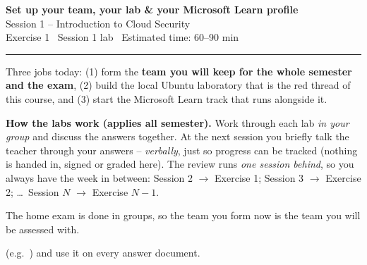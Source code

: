 \documentclass[11pt]{article}
\begin{document}
\begin{center}
  {\LARGE\bfseries Set up your team, your lab \& your Microsoft Learn profile}\\[3pt]
  {\large Session 1 -- Introduction to Cloud Security}\\[5pt]
  {\small Exercise 1 \textperiodcentered\ Session 1 lab \textperiodcentered\ Estimated time: 60--90 min}
\end{center}
\vspace{2pt}\hrule\vspace{1.1em}

Three jobs today: (1) form the
\textbf{team you will keep for the whole semester and the exam}, (2) build the local Ubuntu laboratory
that is the red thread of this course, and (3) start the Microsoft Learn track that runs alongside it.

\par\medskip\noindent
\textbf{How the labs work (applies all semester).} Work through each lab \emph{in your group} and
discuss the answers together. At the next session you briefly talk the teacher through your answers --
\emph{verbally}, just so progress can be tracked (nothing is handed in, signed or graded here). The
review runs \emph{one session behind}, so you always have the week in between: Session 2 $\rightarrow$
Exercise 1; Session 3 $\rightarrow$ Exercise 2; \dots\ Session $N$ $\rightarrow$ Exercise $N\!-\!1$.
\par\medskip

The home exam is done in groups, so the team you form now is the team you will be assessed with.


 (e.g.\ ) and use it on every answer document.

\end{document}
